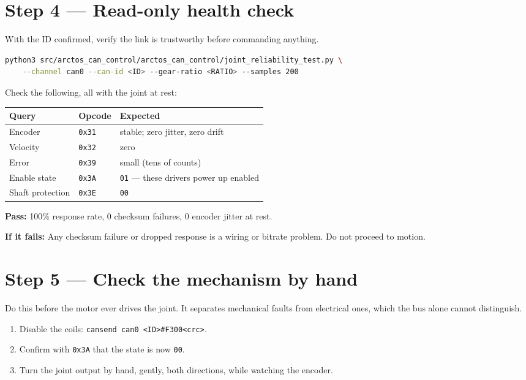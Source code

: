 \documentclass[11pt,letterpaper]{article}
\newcommand{\passif}[1]{\par\vspace{2pt}\noindent\textbf{\color{okgreen}Pass:} #1\par\vspace{4pt}}
\newcommand{\failif}[1]{\noindent\textbf{If it fails:} #1\par\vspace{6pt}}
\begin{document}
\section*{Step 4 --- Read-only health check}
With the ID confirmed, verify the link is trustworthy before commanding anything.
\begin{lstlisting}[language=bash]
python3 src/arctos_can_control/arctos_can_control/joint_reliability_test.py \
    --channel can0 --can-id <ID> --gear-ratio <RATIO> --samples 200
\end{lstlisting}
Check the following, all with the joint at rest:

\begin{table}[h]
\centering
\begin{tabular}{lll}
\toprule
\textbf{Query} & \textbf{Opcode} & \textbf{Expected} \\ \midrule
Encoder        & \texttt{0x31} & stable; zero jitter, zero drift \\
Velocity       & \texttt{0x32} & zero \\
Error          & \texttt{0x39} & small (tens of counts) \\
Enable state   & \texttt{0x3A} & \texttt{01} --- these drivers power up enabled \\
Shaft protection & \texttt{0x3E} & \texttt{00} \\
\bottomrule
\end{tabular}
\end{table}
\passif{100\% response rate, 0 checksum failures, 0 encoder jitter at rest.}
\failif{Any checksum failure or dropped response is a wiring or bitrate problem.
Do not proceed to motion.}

\section*{Step 5 --- Check the mechanism by hand}
Do this before the motor ever drives the joint. It separates mechanical faults from
electrical ones, which the bus alone cannot distinguish.

\begin{enumerate}[leftmargin=*]
    \item Disable the coils: \texttt{cansend can0 <ID>\#F300<crc>}.
    \item Confirm with \texttt{0x3A} that the state is now \texttt{00}.
    \item Turn the joint output by hand, gently, both directions, while watching the
          encoder.
\end{enumerate}
\end{document}
